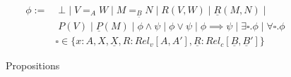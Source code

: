 \documentclass[acmsmall]{acmart}
\begin{document}
\begin{figure}[!htbp]
  \centering

  \begin{align*}
    \phi :=&\; \bot\;|\;V=_{A}W \;|\; M=_{\underline{B}}N \;|\; R(V,W) \;|\; \underline{R}(M,N) \;|\; 
    \\
    &\; P(V)\;|\; \underline{P}(M)\;|\;\phi \land \psi \;|\; \phi \lor \psi \;|\; \phi \implies \psi \;|\; \exists \square.\phi \;|\; \forall \square .\phi \\ 
    & \square \in \{x:A,X,\underline{X},R:Rel_v[A,A'],\underline{R}:Rel_c[\underline{B},\underline{B}']\}
    \end{align*}
  \caption{Propositions}
  \label{fig:Props}
\end{figure}
\end{document}
